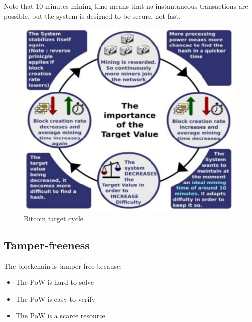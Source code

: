 Note that 10 minutes mining time means that no instantaneous transactions are possible, but the system is designed to be secure, not fast.

\begin{figure}[htbp]
   \centering
   \includegraphics{images/bitcoin_targetcycle.png}
   \caption{Bitcoin target cycle}
   \label{fig:bitcoin_targetcycle}
\end{figure}


\subsection{Tamper-freeness}
The blockchain is tamper-free because:
\begin{itemize}
   \item The PoW is hard to solve
   \item The PoW is easy to verify
   \item The PoW is a scarce resource
\end{itemize}

